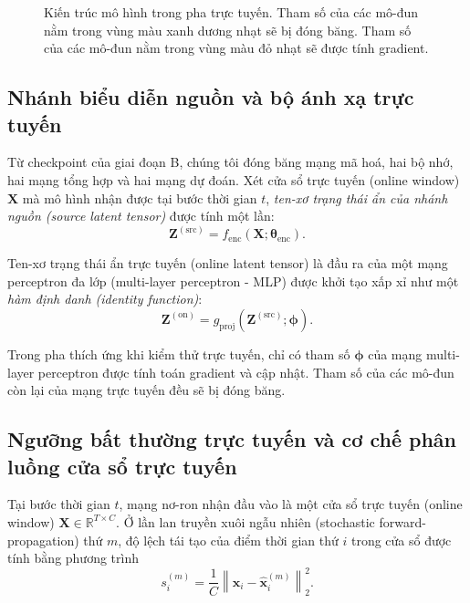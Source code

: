\begin{figure}[H]
    \centering
    
    \caption[Kiến trúc mô hình trong pha trực tuyến.] {Kiến trúc mô hình trong pha trực tuyến. Tham số của các mô-đun nằm trong vùng màu xanh dương nhạt sẽ bị đóng băng. Tham số của các mô-đun nằm trong vùng màu đỏ nhạt sẽ được tính gradient.}
    \label{fig:architecture-online-phase}
\end{figure}

\subsection{Nhánh biểu diễn nguồn và bộ ánh xạ trực tuyến}

Từ checkpoint của giai đoạn B, chúng tôi đóng băng mạng mã hoá, hai bộ nhớ, hai mạng tổng hợp và hai mạng dự đoán. Xét cửa sổ trực tuyến (online window) \(\mathbf{X}\) mà mô hình nhận được tại bước thời gian \(t\), \textit{ten-xơ trạng thái ẩn của nhánh nguồn (source latent tensor)} được tính một lần:
\begin{equation}
\mathbf{Z}^{(\mathrm{src})}
=
f_{\mathrm{enc}}
\left(
\mathbf{X};
\boldsymbol{\theta}_{\mathrm{enc}}
\right).
\end{equation}

Ten-xơ trạng thái ẩn trực tuyến (online latent tensor) là đầu ra của một mạng perceptron đa lớp (multi-layer perceptron - MLP) được khởi tạo xấp xỉ như một \textit{hàm định danh (identity function)}:
\begin{equation}
\mathbf{Z}^{(\mathrm{on})}
=
g_{\mathrm{proj}}
\left(
\mathbf{Z}^{(\mathrm{src})};
\boldsymbol{\phi}
\right).
\end{equation}

Trong pha thích ứng khi kiểm thử trực tuyến, chỉ có tham số \(\boldsymbol{\phi}\) của mạng multi-layer perceptron được tính toán gradient và cập nhật. Tham số của các mô-đun còn lại của mạng trực tuyến đều sẽ bị đóng băng.

\subsection{Ngưỡng bất thường trực tuyến và cơ chế phân luồng cửa sổ trực tuyến}
\label{sec:route-and-verify-pnn}

Tại bước thời gian \(t\), mạng nơ-ron nhận đầu vào là một cửa sổ trực tuyến (online window) \(\mathbf{X}\in\mathbb{R}^{T\times C}\). Ở lần lan truyền xuôi ngẫu nhiên (stochastic forward-propagation) thứ \(m\), độ lệch tái tạo của điểm thời gian thứ \(i\) trong cửa sổ được tính bằng phương trình
\begin{equation}
s^{(m)}_{i}
=
\frac{1}{C}
\left\|
\mathbf{x}_{i}
-
\widehat{\mathbf{x}}^{(m)}_{i}
\right\|_2^2.
\end{equation}

